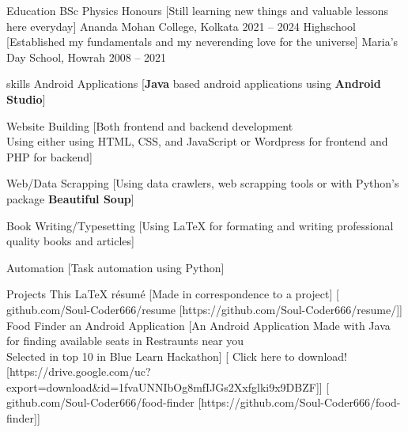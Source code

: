 \documentclass[
]{llresume}
\renewcommand{\emph}[1]{{\bfseries\color{accentcolor}#1}}
\begin{document}
\makeheader

\begin{mainpane}
    \begin{mainsection}{Education}
        \entryJob
            {BSc Physics Honours}
            [Still learning new things and valuable lessons here everyday]
            {Ananda Mohan College, Kolkata}
            {2021 -- 2024}
        \entryJob
            {Highschool}
            [Established my fundamentals and my neverending love for the universe]
            {Maria's Day School, Howrah}
            {2008 -- 2021}
    \end{mainsection}

    \begin{mainsection}{skills}
        \entryGeneric
            {Android Applications}
            [\emph{Java} based android applications using \emph{Android Studio}]

        \entryGeneric
            {Website Building}
            [Both frontend and backend development\\
            Using either using HTML, CSS, and JavaScript or Wordpress for frontend and PHP for backend]

        \entryGeneric
            {Web/Data Scrapping}
            [Using data crawlers, web scrapping tools or with Python's package \emph{Beautiful Soup}]

        \entryGeneric
            {Book Writing/Typesetting}
            [Using LaTeX for formating and writing professional quality books and articles]


        \entryGeneric
            {Automation}
            [Task automation using Python]
    \end{mainsection}

    \begin{mainsection}{Projects}
        \entryGeneric
            {This LaTeX r\'esum\'e}
            [Made in correspondence to a project]
            [\infoGithub
                {github.com/Soul-Coder666/resume}
                [https://github.com/Soul-Coder666/resume/]]
        \entryGeneric
            {Food Finder an Android Application}
            [An Android Application Made with Java for finding available seats in Restraunts near you\\
            Selected in top 10 in Blue Learn Hackathon]
            [\infoHomepage
                {Click here to download!}
                [https://drive.google.com/uc?export=download&id=1fvaUNNIbOg8mfIJGs2Xxfglki9x9DBZF]]
            [\infoGithub
                {github.com/Soul-Coder666/food-finder}
                [https://github.com/Soul-Coder666/food-finder]]
    \end{mainsection}


\end{mainpane}
\end{document}
